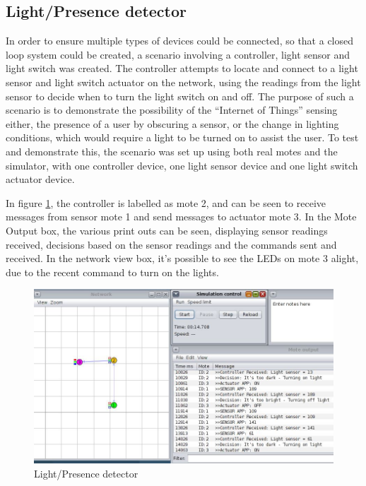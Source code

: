 \subsection{Light/Presence detector} %
\label{sub:presence_detector}
In order to ensure multiple types of devices could be connected, so that a closed loop system could be created, a scenario involving a controller, light sensor and light switch was created. The controller attempts to locate and connect to a light sensor and light switch actuator on the network, using the readings from the light sensor to decide when to turn the light switch on and off. The purpose of such a scenario is to demonstrate the possibility of the ``Internet of Things'' sensing either, the presence of a user by obscuring a sensor, or the change in lighting conditions, which would require a light to be turned on to assist the user.
To test and demonstrate this, the scenario was set up using both real motes and the simulator, with one controller device, one light sensor device and one light switch actuator device.

In figure \ref{fig:lighttest}, the controller is labelled as mote 2, and can be seen to receive messages from sensor mote 1 and send messages to actuator mote 3. In the Mote Output box, the various print outs can be seen, displaying sensor readings received, decisions based on the sensor readings and the commands sent and received. In the network view box, it's possible to see the LEDs on mote 3 alight, due to the recent command to turn on the lights.

\begin{figure}[h]
\centering
\includegraphics[scale=0.5]{evaluation/img/lightswitch.jpg}
\caption{Light/Presence detector}
\label{fig:lighttest}
\end{figure}

